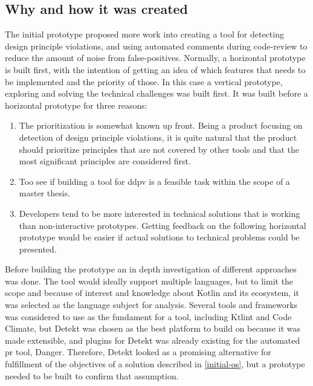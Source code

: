 \documentclass{report}
\begin{document}
\subsection*{Why and how it was created}
The initial prototype proposed more work into creating a tool for detecting design principle violations, and using automated comments during code-review to reduce the amount of noise from false-positives. Normally, a horizontal prototype is built first, with the intention of getting an idea of which features that needs to be implemented and the priority of those. In this case a vertical prototype, exploring and solving the technical challenges was built first. It was built before a horizontal prototype for three reasons:

\begin{enumerate}
    \item The prioritization is somewhat known up front. Being a product focusing on detection of design principle violations, it is quite natural that the product should prioritize principles that are not covered by other tools and that the most significant principles are considered first.
    \item Too see if building a tool for \gls{ddpv} is a feasible task within the scope of a master thesis.
    \item Developers tend to be more interested in technical solutions that is working than non-interactive prototypes. Getting feedback on the following horizontal prototype would be easier if actual solutions to technical problems could be presented.
\end{enumerate}

Before building the prototype an in depth investigation of different approaches was done. The tool would ideally support multiple languages, but to limit the scope and because of interest and knowledge about Kotlin and its ecosystem, it was selected as the language subject for analysis. Several tools and frameworks was considered to use as the fundament for a tool, including Ktlint\cite{ktlint} and Code Climate\cite{codeclimate}, but Detekt\cite{detekt} was chosen as the best platform to build on because it was made extensible, and plugins for Detekt was already existing for the automated \gls{pr} tool\cite{danger-detekt-plugin}, Danger\cite{danger}. Therefore, Detekt looked as a promising alternative for fulfillment of the objectives of a solution described in \ref{initial-os}, but a prototype needed to be built to confirm that assumption. 
\end{document}
